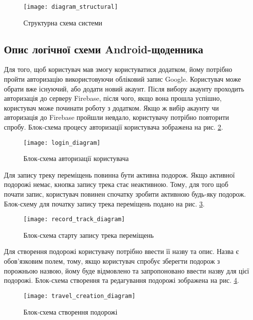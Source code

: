 \documentclass[../main.tex]{subfiles}
\begin{document}
\begin{figure}[H]
	\centering
	\texttt{[image: diagram\_structural]}
	\caption{Структурна схема системи} %
	\label{diagram:structural}
\end{figure}

\subsection{Опис логічної схеми Android-щоденника}
Для того, щоб користувач мав змогу користуватися додатком, йому потрібно пройти авторизацію використовуючи обліковий запис Google. Користувач може обрати вже існуючий, або додати новий акаунт. Після вибору акаунту проходить авторизація до серверу Firebase, після чого, якщо вона прошла успішно, користувач може починати роботу з додатком. Якщо ж вибір акаунту чи авторизація до Firebase пройшли невдало, користувачу потрібно повторити спробу. Блок-схема процесу авторизації користувача зображена на рис. \ref{diagram:login}.

\begin{figure}[H]
	\centering
	\texttt{[image: login\_diagram]}
	\caption{Блок-схема авторизації користувача}
	\label{diagram:login}
\end{figure}

Для запису треку переміщень повинна бути активна подорож. Якщо активної подорожі немає, кнопка запису трека стає неактивною. Тому, для того щоб почати запис, користувач повинен спочатку зробити активною будь-яку подорож. Блок-схему для початку запису трека переміщень подано на рис. \ref{diagram:start_tracking}.

\begin{figure}[H]
	\centering
	\texttt{[image: record\_track\_diagram]}
	\caption{Блок-схема старту запису трека переміщень}
	\label{diagram:start_tracking}
\end{figure}

Для створення подорожі користувачу потрібно ввести її назву та опис. Назва є обов'язковим полем, тому, якщо користувач спробує зберегти подорож з порожньою назвою, йому буде відмовлено та запропоновано ввести назву для цієї подорожі. Блок-схема створення та редагування подорожі зображена на рис. \ref{diagram:travel_creation}.

\begin{figure}[H]
	\centering
	\texttt{[image: travel\_creation\_diagram]}
	\caption{Блок-схема створення подорожі}
	\label{diagram:travel_creation}
\end{figure}
\end{document}
